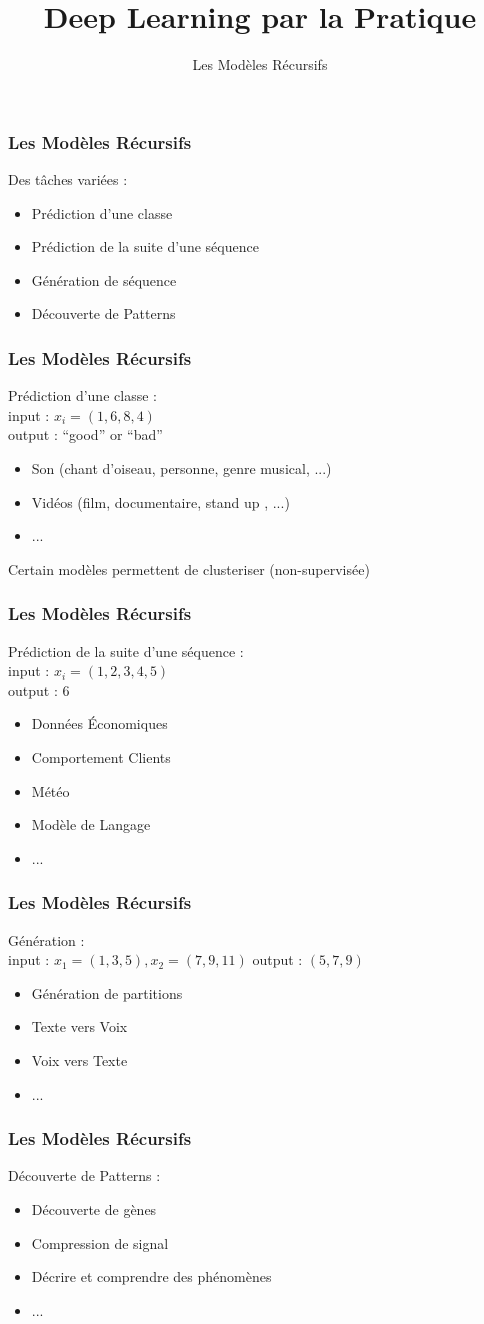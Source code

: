 \documentclass{formation}
\title{Deep Learning par la Pratique}
\subtitle{Les Modèles Récursifs}
\begin{document}
\maketitle

\begin{frame}
  \frametitle{Les Modèles Récursifs}
  Des tâches variées :
  \begin{itemize}
  \item Prédiction d'une classe
  \item Prédiction de la suite d'une séquence
  \item Génération de séquence
  \item Découverte de Patterns
  \end{itemize}
\end{frame}

\begin{frame}
  \frametitle{Les Modèles Récursifs}
  Prédiction d'une classe : \\
  input : $x_i=(1,6,8,4)$ \\
  output : ``good'' or ``bad''
  \begin{itemize}
  \item Son (chant d'oiseau, personne, genre musical, ...)
  \item Vidéos (film, documentaire, stand up , ...)
  \item ...
  \end{itemize}
  Certain modèles permettent de clusteriser (non-supervisée)
\end{frame}

\begin{frame}
  \frametitle{Les Modèles Récursifs}
  Prédiction de la suite d'une séquence : \\
  input : $x_i=(1,2,3,4,5)$ \\
  output : 6
  \begin{itemize}
  \item Données Économiques
  \item Comportement Clients
  \item Météo
  \item Modèle de Langage
  \item ...
  \end{itemize}
\end{frame}

\begin{frame}
  \frametitle{Les Modèles Récursifs}
  Génération : \\
  input : $x_1=(1,3,5),x_2=(7,9,11)$
  output : $(5,7,9)$
  \begin{itemize}
  \item Génération de partitions
  \item Texte vers Voix
  \item Voix vers Texte
  \item ...
  \end{itemize}
\end{frame}

\begin{frame}
  \frametitle{Les Modèles Récursifs}
  Découverte de Patterns :
  \begin{itemize}
  \item Découverte de gènes
  \item Compression de signal
  \item Décrire et comprendre des phénomènes
  \item ...
  \end{itemize}
\end{frame}
\end{document}
